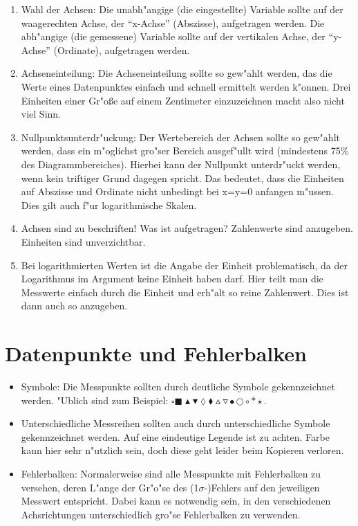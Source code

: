 \begin{enumerate}
    \item Wahl der Achsen: Die unabh"angige (die eingestellte)
    Variable sollte auf der waagerechten Achse, der "`x-Achse"'
    (Abszisse), aufgetragen werden. Die abh"angige (die
    gemessene) Variable sollte auf der vertikalen Achse, der "`y-Achse"'
    (Ordinate), aufgetragen werden.
    \item Achseneinteilung: Die Achseneinteilung sollte so gew"ahlt
    werden, das die Werte eines Datenpunktes einfach und schnell
    ermittelt werden k"onnen. Drei Einheiten einer Gr"o{\ss}e auf einem Zentimeter einzuzeichnen macht also nicht viel Sinn.
    \item Nullpunktsunterdr"uckung: Der Wertebereich der Achsen
    sollte so gew"ahlt werden, dass ein m"oglichst gro"ser Bereich
    ausgef"ullt wird (mindestens 75\% des Diagrammbereiches). Hierbei kann der Nullpunkt
    unterdr"uckt werden, wenn kein triftiger Grund dagegen
    spricht. Das bedeutet, dass die Einheiten auf Abszisse und Ordinate nicht unbedingt bei x=y=0 anfangen m"ussen. Dies gilt auch f"ur logarithmische Skalen.
    \item Achsen sind zu beschriften! Was ist aufgetragen?
    Zahlenwerte sind anzugeben. Einheiten sind unverzichtbar.
    \item Bei logarithmierten Werten ist die Angabe der Einheit problematisch,
     da der Logarithmus im Argument keine Einheit haben darf. Hier teilt man die
     Messwerte einfach durch die Einheit und erh"alt so reine Zahlenwert. Dies ist
     dann auch so anzugeben.
\end{enumerate}

\section{Datenpunkte und Fehlerbalken}

\begin{itemize}
    \item Symbole: Die Messpunkte sollten durch deutliche Symbole
    gekennzeichnet werden. "Ublich sind zum Beispiel: $ \square \blacksquare
    \blacktriangle \blacktriangledown \lozenge \blacklozenge \vartriangle
    \triangledown \bullet \bigcirc \circ \ast \star$.
    \item Unterschiedliche Messreihen sollten auch durch
    unterschiedliche Symbole gekennzeichnet werden. Auf eine
    eindeutige Legende ist zu achten. Farbe kann hier sehr
    n"utzlich sein, doch diese geht leider beim Kopieren verloren.
    \item Fehlerbalken: Normalerweise sind alle Messpunkte mit
    Fehlerbalken zu versehen, deren L"ange der Gr"o"se des (1$\sigma$-)Fehlers
    auf den jeweiligen Messwert entspricht. Dabei kann es notwendig sein, in
    den verschiedenen Achsrichtungen unterschiedlich gro"se
    Fehlerbalken zu verwenden.
\end{itemize}

